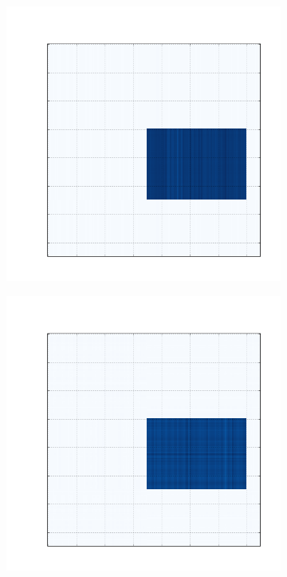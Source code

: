 \documentclass[10pt]{beamer}
\begin{document}
\begin{frame}
\begin{figure}[H]
\begin{subfigure}[b]{0.13\textwidth}
      \end{subfigure}
      \begin{subfigure}[b]{0.13\textwidth}
          \includegraphics[width=\textwidth]{img/a-reconstruction-fkmeans.png}
      \end{subfigure}
      \begin{subfigure}[b]{0.13\textwidth}
          \includegraphics[width=\textwidth]{img/a-reconstruction-onmtf.png}

\end{subfigure}
\end{figure}
\end{frame}
\end{document}
